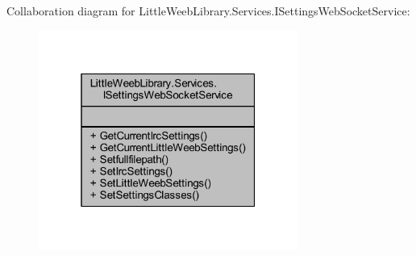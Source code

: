 Collaboration diagram for Little\+Weeb\+Library.\+Services.\+I\+Settings\+Web\+Socket\+Service\+:\nopagebreak
\begin{figure}[H]
\begin{center}
\leavevmode
\includegraphics[width=241pt]{interface_little_weeb_library_1_1_services_1_1_i_settings_web_socket_service__coll__graph}
\end{center}
\end{figure}
